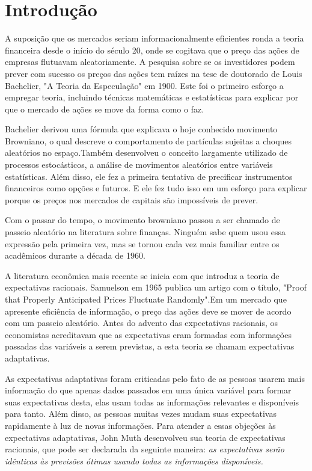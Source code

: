 \chapter*[Introdução]{Introdução}
\label{chap:Introdução}
A suposição que os mercados seriam informacionalmente eficientes ronda a teoria financeira desde o início do século 20, onde se cogitava que o preço das ações de empresas flutuavam aleatoriamente. A pesquisa sobre se os investidores podem prever com sucesso os preços das ações tem raízes na tese de doutorado de Louis Bachelier, "A Teoria da Especulação" em 1900. Este foi o primeiro esforço a empregar teoria, incluindo técnicas matemáticas e estatísticas para explicar por que o mercado de ações se move da forma como o faz.

Bachelier derivou uma fórmula que explicava o hoje conhecido movimento Browniano, o qual descreve o comportamento de partículas sujeitas a choques aleatórios no espaço.Também desenvolveu o conceito largamente utilizado de processos estocásticos, a análise de movimentos aleatórios entre variáveis estatísticas. Além disso, ele fez a primeira tentativa de precificar instrumentos financeiros como opções e futuros. E ele fez tudo isso em um esforço para explicar porque os preços nos mercados de capitais são impossíveis de prever.

Com o passar do tempo, o movimento browniano passou a ser chamado de passeio aleatório na literatura sobre finanças. Ninguém sabe quem usou essa expressão pela primeira vez, mas se tornou cada vez mais familiar entre os acadêmicos durante a década de 1960. 

A literatura econômica mais recente se inicia com  que introduz a teoria de expectativas racionais. Samuelson em 1965 publica um artigo com o título, "Proof that Properly Anticipated Prices Fluctuate Randomly".Em um mercado que apresente eficiência de informação, o preço das ações deve se mover de acordo com um passeio aleatório. Antes do advento das expectativas racionais, os economistas acreditavam que as expectativas eram formadas com informações passadas das variáveis a serem previstas, a esta teoria se chamam expectativas adaptativas.

As expectativas adaptativas foram criticadas pelo fato de as pessoas usarem mais informação do que apenas dados passados em uma única variável para formar suas expectativas desta, elas usam todas as informações relevantes e disponíveis para tanto. Além disso, as pessoas muitas vezes mudam suas expectativas rapidamente à luz de novas informações. Para atender a essas objeções às expectativas adaptativas, John Muth desenvolveu sua teoria de expectativas racionais, que pode ser declarada da seguinte maneira: \emph{as expectativas serão idênticas às previsões ótimas usando todas as informações disponíveis.}

